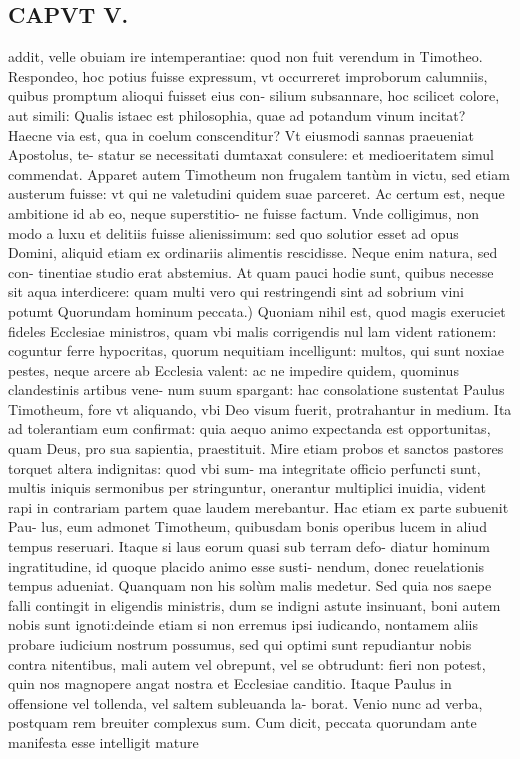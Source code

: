 \documentclass{article}
\begin{document}
\begin{pages}
\section*{CAPVT V. }
\marginpar{[ p.71 ]}\pstart addit, velle obuiam ire intemperantiae: quod non fuit verendum in Timotheo. Respondeo, hoc potius fuisse expressum, vt occurreret improborum calumniis, quibus promptum alioqui fuisset eius con- silium subsannare, hoc scilicet colore, aut simili: Qualis istaec est philosophia, quae ad potandum vinum incitat? Haecne via est, qua in coelum conscenditur? Vt eiusmodi sannas praeueniat Apostolus, te- statur se necessitati dumtaxat consulere: et medioeritatem simul commendat. Apparet autem Timotheum non frugalem tantùm in victu, sed etiam austerum fuisse: vt qui ne valetudini quidem suae parceret. Ac certum est, neque ambitione id ab eo, neque superstitio- ne fuisse factum. Vnde colligimus, non modo a luxu et delitiis fuisse alienissimum: sed quo solutior esset ad opus Domini, aliquid etiam ex ordinariis alimentis rescidisse. Neque enim natura, sed con- tinentiae studio erat abstemius. At quam pauci hodie sunt, quibus necesse sit aqua interdicere: quam multi vero qui restringendi sint ad sobrium vini potumt  \pend\pstart Quorundam hominum peccata.) Quoniam nihil est, quod magis exeruciet fideles Ecclesiae ministros, quam vbi malis corrigendis nul lam vident rationem: coguntur ferre hypocritas, quorum nequitiam incelligunt: multos, qui sunt noxiae pestes, neque arcere ab Ecclesia valent: ac ne impedire quidem, quominus clandestinis artibus vene- num suum spargant: hac consolatione sustentat Paulus Timotheum, fore vt aliquando, vbi Deo visum fuerit, protrahantur in medium. Ita ad tolerantiam eum confirmat: quia aequo animo expectanda est opportunitas, quam Deus, pro sua sapientia, praestituit. Mire etiam probos et sanctos pastores torquet altera indignitas: quod vbi sum- ma integritate officio perfuncti sunt, multis iniquis sermonibus per stringuntur, onerantur multiplici inuidia, vident rapi in contrariam partem quae laudem merebantur. Hac etiam ex parte subuenit Pau- lus, eum admonet Timotheum, quibusdam bonis operibus lucem in aliud tempus reseruari. Itaque si laus eorum quasi sub terram defo- diatur hominum ingratitudine, id quoque placido animo esse susti- nendum, donec reuelationis tempus adueniat. Quanquam non his solùm malis medetur. Sed quia nos saepe falli contingit in eligendis ministris, dum se indigni astute insinuant, boni autem nobis sunt ignoti:deinde etiam si non erremus ipsi iudicando, nontamem aliis probare iudicium nostrum possumus, sed qui optimi sunt repudiantur nobis contra nitentibus, mali autem vel obrepunt, vel se obtrudunt: fieri non potest, quin nos magnopere angat nostra et Ecclesiae canditio. Itaque Paulus in offensione vel tollenda, vel saltem subleuanda la- borat. Venio nunc ad verba, postquam rem breuiter complexus sum. Cum dicit, peccata quorundam ante manifesta esse intelligit mature  \pend

\end{pages}
\end{document}
